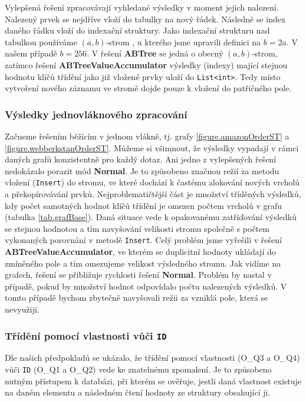Vylepšená řešení zpracovávají vyhledané výsledky v moment jejich nalezení.
Nalezený prvek se nejdříve vloží do tabulky na nový řádek. 
Následně se index daného řádku vloží do indexační struktury. 
Jako indexační strukturu nad tabulkou používáme $(a, b)$-strom \citep[str. 190]{labyrint}, u kterého jsme upravili definici na $b=2a$.
V našem případě $b=256$.
V řešení \textbf{ABTree} se jedná o obecný $(a, b)$-strom, zatímco řešení \textbf{ABTreeValueAccumulator} výsledky (indexy) mající stejnou hodnotu klíčů třídění jako již vložené prvky uloží do \verb+List<int>+.
Tedy místo vytvoření nového záznamu ve stromě dojde pouze k vložení do patřičného pole.

\subsubsection{Výsledky jednovláknového zpracování}

Začneme řešením běžícím v jednom vlákně, tj. grafy \ref{figure.amazonOrderST} a \ref{figure.webberkstanOrderST}.
Můžeme si všimnout, že výsledky vypadají v rámci daných grafů konzistentně pro každý dotaz.
Ani jedno z vylepšených řešení nedokázalo porazit mód \textbf{Normal}. 
Je to způsobeno značnou režií za metodu vložení (\verb+Insert+) do stromu, ve které dochází k častému alokování nových vrcholů a překopírovávání prvků.
Nejproblematičtější část je množství tříděných výsledků, kdy počet samotných hodnot klíčů třídění je omezen počtem vrcholů v grafu (tabulka \ref{tab.grafBase}). 
Daná situace vede k opakovanému zatřiďování výsledků se stejnou hodnotou a tím navyšování velikosti stromu společně s počtem vykonaných porovnání v metodě \verb+Insert+.
Celý problém jsme vyřešili v řešení \textbf{ABTreeValueAccumulator}, ve kterém se duplicitní hodnoty ukládají do zmíněného pole a tím omezujeme velikost výsledného stromu. 
Jak vidíme na grafech, řešení se přibližuje rychlosti řešení \textbf{Normal}.
Problém by nastal v případě, pokud by množství hodnot odpovídalo počtu nalezených výsledků. 
V tomto případě bychom zbytečně navyšovali režii za vzniklá pole, která se nevyužijí.

\subsubsection{Třídění pomocí vlastnosti vůči \texttt{ID}}

Dle našich předpokladů se ukázalo, že třídění pomocí vlastnosti (O\_Q3 a O\_Q4) vůči \verb+ID+ (O\_Q1 a O\_Q2) vede ke znatelnému zpomalení.
Je to způsobeno nutným přístupem k databázi, při kterém se ověřuje, jestli daná vlastnost existuje na daném elementu a následném čtení hodnoty ze struktury obsahující ji.

